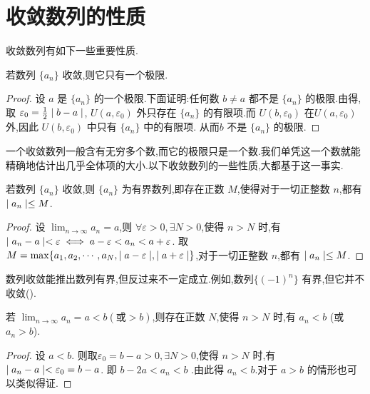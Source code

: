 \section{收敛数列的性质}

收敛数列有如下一些重要性质.

\begin{theorem}[极限的唯一性]
    若数列 $\{a_n\}$ 收敛,则它只有一个极限.
\end{theorem}

\begin{proof}
    设 $a$ 是 $\{a_n\}$ 的一个极限.下面证明:任何数 $b\ne a$ 都不是 $\{a_n\}$ 的极限.由得,取 $\varepsilon_0=\frac{1}{2}\mid b-a \mid$, $U(a,\varepsilon_0)$ 外只存在 $\{a_n\}$ 的有限项.而 $U(b,\varepsilon_0)$ 在$U(a,\varepsilon_0)$ 外,因此  $U(b,\varepsilon_0)$ 中只有 $\{a_n\}$ 中的有限项. 从而$b$ 不是 $\{a_n\}$ 的极限.
\end{proof}

一个收敛数列一般含有无穷多个数,而它的极限只是一个数.我们单凭这一个数就能精确地估计出几乎全体项的大小.以下收敛数列的一些性质,大都基于这一事实.

\begin{theorem}[收敛数列的有界性]
    若数列 $\{a_n\}$ 收敛,则 $\{a_n\}$ 为有界数列,即存在正数 $M$,使得对于一切正整数 $n$,都有 $\mid a_n \mid\le M$.
\end{theorem}

\begin{proof}
    设 $\lim_{n\to\infty} a_n = a$,则 $\forall \varepsilon>0,\exists N>0 $,使得 $ n>N$ 时,有 $\mid a_n-a \mid<\varepsilon\iff a-\varepsilon < a_n <a+\varepsilon$. 取 $M=\max \{a_1,a_2,\cdots,a_N,\mid a-\varepsilon \mid,\mid a+\varepsilon \mid\}$,对于一切正整数 $n$,都有 $\mid a_n \mid\le M$.
\end{proof}

\begin{annotation}
    数列收敛能推出数列有界,但反过来不一定成立.例如,数列$\{(-1)^n\}$ 有界,但它并不收敛().
\end{annotation}

\begin{theorem}[极限的保序性1]\label{thm:xu1}
    若 $\lim_{n\to\infty} a_n=a<b(\text{或}>b)$,则存在正数 $N$,使得 $n>N$ 时,有 $a_n<b$ (或 $a_n>b$).
\end{theorem}

\begin{proof}
    设 $a<b$. 则取$ \varepsilon_0=b-a>0,\exists N>0$,使得 $ n>N$ 时,有 $\mid a_n-a \mid<\varepsilon_0=b-a$. 即 $b-2a<a_n<b$ .由此得 $a_n<b$.对于 $a>b$ 的情形也可以类似得证.
\end{proof}

